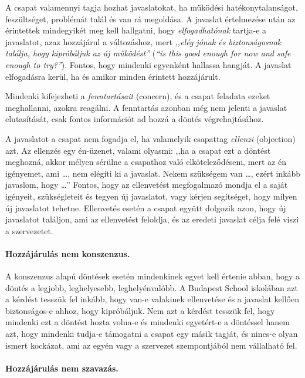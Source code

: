 A csapat valamennyi tagja hozhat javaslatokat, ha működési
hatékonytalanságot, feszültséget, problémát talál és van rá megoldása. A
javaslat értelmezése után az érintettek mindegyikét meg kell hallgatni,
hogy \emph{elfogadhatónak} tartja-e a javaslatot, azaz hozzájárul a
változáshoz, mert \emph{,,elég jónak és biztonságosnak találja, hogy
kipróbáljuk az új működést''} (\emph{``is this good enough for now and
safe enough to try?''}). Fontos, hogy mindenki egyenként hallassa
hangját. A javaslat elfogadásra kerül, ha és amikor minden érintett
hozzájárult.

Mindenki kifejezheti a \emph{fenntartásait} (concern), és a csapat
feladata ezeket meghallanni, azokra reagálni. A fenntartás azonban még
nem jelenti a javaslat elutasítását, csak fontos információt ad hozzá a
döntés végrehajtásához.

A javaslatot a csapat nem fogadja el, ha valamelyik csapattag
\emph{ellenzi} (objection) azt. Az ellenzés egy én-üzenet, valami
olyasmi: ,,ha a csapat ezt a döntést meghozná, akkor mélyen sérülne a
csapathoz való elköteleződésem, mert az én igényemet, ami \ldots{}, nem
elégíti ki a javaslat. Nekem szükségem van \ldots{}, ezért inkább
javaslom, hogy \ldots{}'' Fontos, hogy az ellenvetést megfogalmazó
mondja el a saját igényeit, szükségleteit és tegyen új javaslatot, vagy
kérjen segítséget, hogy milyen új javaslatot tehetne. Ellenvetés esetén
a csapat együtt dolgozik azon, hogy új javaslatot találjon, ami az
ellenvetést feloldja, és az eredeti javaslat célja felé viszi a
szervezetet.


\paragraph{Hozzájárulás nem
konszenzus.}

A konszenzus alapú döntések esetén mindenkinek egyet kell értenie abban,
hogy a döntés a legjobb, leghelyesebb, leghelyénvalóbb. A Budapest
School iskolában azt a kérdést tesszük fel inkább, hogy van-e valakinek
ellenvetése és a javaslat kellően biztonságos-e ahhoz, hogy kipróbáljuk.
Nem azt a kérdést tesszük fel, hogy mindenki ezt a döntést hozta volna-e
és mindenki egyetért-e a döntéssel hanem azt, hogy mindenki tudja-e
támogatni a csapat egy másik tagját, és nincs-e olyan ismert kockázat,
ami az egyén vagy a szervezet szempontjából nem vállalható fel.


\paragraph{Hozzájárulás nem
szavazás.}

